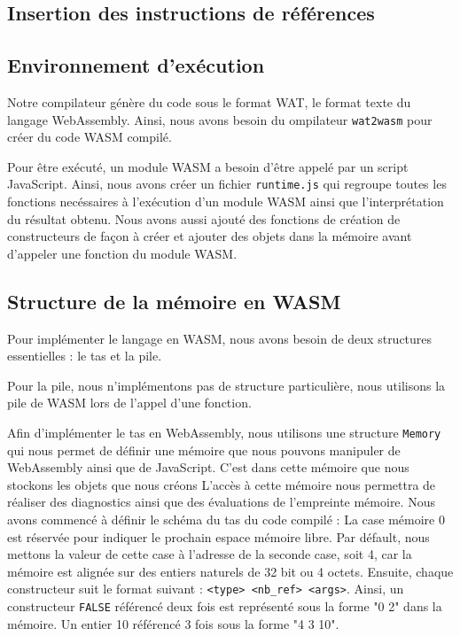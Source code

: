 \documentclass{rapportECL}
\begin{document}
\subsection{Insertion des instructions de références} \label{insert_inc_dec}


\subsection{Environnement d'exécution}

Notre compilateur génère du code sous le format WAT, le format texte du langage WebAssembly. Ainsi, nous avons besoin
du ompilateur \verb|wat2wasm| pour créer du code WASM compilé.

Pour être exécuté, un module WASM a besoin d'être appelé par un script JavaScript. Ainsi, nous avons créer un fichier 
\verb|runtime.js| qui regroupe toutes les fonctions necéssaires à l'exécution d'un module WASM ainsi que l'interprétation
du résultat obtenu. Nous avons aussi ajouté des fonctions de création de constructeurs de façon à créer et ajouter des objets 
dans la mémoire avant d'appeler une fonction du module WASM.

\subsection{Structure de la mémoire en WASM}

Pour implémenter le langage en WASM, nous avons besoin de deux structures essentielles : le tas et la pile.

\medskip

Pour la pile, nous n'implémentons pas de structure particulière, nous utilisons la pile de WASM lors de l'appel d'une fonction.

\medskip

Afin d'implémenter le tas en WebAssembly, nous utilisons une structure \verb|Memory| qui nous permet de définir une mémoire que 
nous pouvons manipuler de WebAssembly ainsi que de JavaScript.
C'est dans cette mémoire que nous stockons les objets que nous créons
L'accès à cette mémoire nous permettra de réaliser des diagnostics ainsi que des évaluations de l'empreinte mémoire.
Nous avons commencé à définir le schéma du tas du code compilé :
La case mémoire 0 est réservée pour indiquer le prochain espace mémoire libre. Par défault, nous mettons la valeur de cette case à 
l'adresse de la seconde case, soit 4, car la mémoire est alignée sur des entiers naturels de 32 bit ou 4 octets.
Ensuite, chaque constructeur suit le format suivant : \verb|<type> <nb_ref> <args>|. Ainsi, un constructeur \verb|FALSE| référencé 
deux fois est représenté sous la forme "0 2" dans la mémoire. Un entier 10 référencé 3 fois sous la forme "4 3 10".
\end{document}
